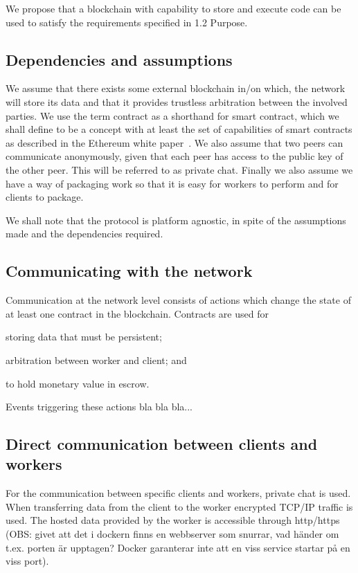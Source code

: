 We propose that a blockchain with capability to store and execute code can be used to satisfy the requirements specified in 1.2 Purpose.

\subsection{Dependencies and assumptions}
We assume that there exists some external blockchain in/on which, the network will store its data and that it provides trustless arbitration between the involved parties. We use the term contract as a shorthand for smart contract, which we shall define to be a concept with at least the set of capabilities of smart contracts as described in the Ethereum white paper~\cite{ethereum:white}. We also assume that two peers can communicate anonymously, given that each peer has access to the public key of the other peer. This will be referred to as private chat. Finally we also assume we have a way of packaging work so that it is easy for workers to perform and for clients to package.

We shall note that the protocol is platform agnostic, in spite of the assumptions made and the dependencies required.

\subsection{Communicating with the network}
Communication at the network level consists of actions which change the state of at least one contract in the blockchain. Contracts are used for
\begin{inparaenum}
\item storing data that must be persistent;
\item arbitration between worker and client; and
\item to hold monetary value in escrow.
\end{inparaenum}
Events triggering these actions bla bla bla...

\subsection{Direct communication between clients and workers}
For the communication between specific clients and workers, private chat is used. When transferring data from the client to the worker encrypted TCP/IP traffic is used. The hosted data provided by the worker is accessible through http/https (OBS: givet att det i dockern finns en webbserver som snurrar, vad händer om t.ex. porten är upptagen? Docker garanterar inte att en viss service startar på en viss port).

